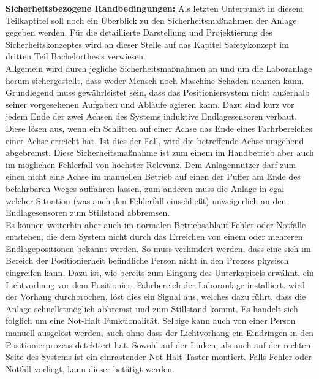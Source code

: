 \documentclass[../Bachelorarbeit.tex]{subfiles}
\begin{document}
\smallskip
\newline
\textbf{Sicherheitsbezogene Randbedingungen:}
Als letzten Unterpunkt in diesem Teilkaptitel soll noch ein Überblick zu den Sicherheitsmaßnahmen der Anlage gegeben werden. Für die detaillierte Darstellung und Projektierung des Sicherheitskonzeptes wird an dieser Stelle auf das Kapitel Safetykonzept im dritten Teil Bachelorthesis verwiesen.\\
Allgemein wird durch jegliche Sicherheitsmaßnahmen an und um die Laboranlage herum sichergestellt, dass weder Mensch noch Maschine Schaden nehmen kann. Grundlegend muss gewährleistet sein, dass das Positioniersystem nicht außerhalb seiner vorgesehenen Aufgaben und Abläufe agieren kann. Dazu sind kurz vor jedem Ende der zwei Achsen des Systems induktive Endlagesensoren verbaut. Diese lösen aus, wenn ein Schlitten auf einer Achse das Ende eines Farhrbereiches einer Achse erreicht hat. Ist dies der Fall, wird die betreffende Achse umgehend abgebremst. Diese Sicherheitsmaßnahme ist zum einem im Handbetrieb aber auch im möglichen Fehlerfall von höchster Relevanz. Dem Anlagennutzer darf zum einen nicht eine Achse im manuellen Betrieb auf einen der Puffer am Ende des befahrbaren Weges auffahren lassen, zum anderen muss die Anlage in egal welcher Situation (was auch den Fehlerfall einschließt) unweigerlich an den Endlagesensoren zum Stillstand abbremsen.\\
Es können weiterhin aber auch im normalen Betriebsablauf Fehler oder Notfälle entstehen, die dem System nicht durch das Erreichen von einem oder mehreren Endlagepositionen bekannt werden. So muss verhindert werden, dass eine sich im Bereich der Positionierheit befindliche Person nicht in den Prozess physisch eingreifen kann. Dazu ist, wie bereits zum Eingang des Unterkapitels erwähnt, ein Lichtvorhang vor dem Positionier- \bzw Fahrbereich der Laboranlage installiert. wird der Vorhang durchbrochen, löst dies ein Signal aus, welches dazu führt, dass die Anlage schnellstmöglich abbremst und zum Stillstand kommt. Es handelt sich folglich um eine Not-Halt Funktionalität. Selbige kann auch von einer Person manuell ausgelöst werden, auch ohne dass der Lichtvorhang ein Eindringen in den Positionierprozess detektiert hat. Sowohl auf der Linken, als auch auf der rechten Seite des Systems ist ein einrastender Not-Halt Taster montiert. Falls Fehler oder Notfall vorliegt, kann dieser betätigt werden.\\
\end{document}
